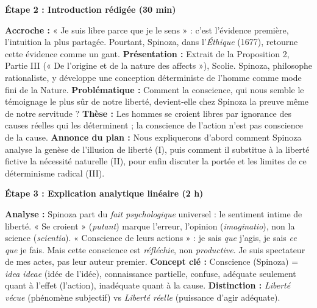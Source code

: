 \documentclass[11pt]{article}
\newcommand{\cle}[1]{{\popxbold\color{popdark}#1}}
\begin{document}
\textbf{Étape 2 : Introduction rédigée (30 min)}\par
\begin{exemplebox}
\textbf{Accroche :} « Je suis libre parce que je le sens » : c'est l'évidence première, l'intuition la plus partagée. Pourtant, Spinoza, dans l'\emph{Éthique} (1677), retourne cette évidence comme un gant.
\textbf{Présentation :} Extrait de la Proposition 2, Partie III (« De l'origine et de la nature des affects »), Scolie. Spinoza, philosophe rationaliste, y développe une conception déterministe de l'homme comme mode fini de la Nature.
\textbf{Problématique :} Comment la conscience, qui nous semble le témoignage le plus sûr de notre liberté, devient-elle chez Spinoza la preuve même de notre servitude ?
\textbf{Thèse :} Les hommes se croient libres par ignorance des causes réelles qui les déterminent ; la conscience de l'action n'est pas conscience de la cause.
\textbf{Annonce du plan :} Nous expliquerons d'abord comment Spinoza analyse la genèse de l'illusion de liberté (I), puis comment il substitue à la liberté fictive la nécessité naturelle (II), pour enfin discuter la portée et les limites de ce déterminisme radical (III).
\end{exemplebox}

\textbf{Étape 3 : Explication analytique linéaire (2 h)}\par

\begin{experience}
\textbf{Analyse :} Spinoza part du \emph{fait psychologique} universel : le sentiment intime de liberté. « Se croient » (\emph{putant}) marque l'erreur, l'opinion (\emph{imaginatio}), non la science (\emph{scientia}). « Conscience de leurs actions » : je sais \emph{que} j'agis, je sais \emph{ce que} je fais. Mais cette conscience est \emph{réfléchie}, non \emph{productive}. Je suis spectateur de mes actes, pas leur auteur premier.
\textbf{Concept clé :} \cle{Conscience} (Spinoza) = \emph{idea ideae} (idée de l'idée), connaissance partielle, confuse, adéquate seulement quant à l'effet (l'action), inadéquate quant à la cause.
\textbf{Distinction :} \emph{Liberté vécue} (phénomène subjectif) vs \emph{Liberté réelle} (puissance d'agir adéquate).
\end{experience}
\end{document}
